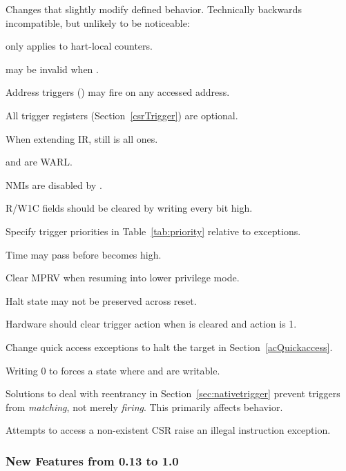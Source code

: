 \begin{steps}{Changes that slightly modify defined behavior. Technically backwards
incompatible, but unlikely to be noticeable:}
    \item \FcsrDcsrStopcount only applies to hart-local counters. 
    \item \FdmDmstatusVersion may be invalid when . 
    \item Address triggers (\RcsrMcontrol) may fire on any accessed address. 
    \item All trigger registers (Section~\ref{csrTrigger}) are optional. 
    \item When extending IR, \RdtmBypass still is all ones. 
    \item \FcsrDcsrEbreaks and \FcsrDcsrEbreaku are WARL. 
    \item NMIs are disabled by \FcsrDcsrStepie. 
    \item R/W1C fields should be cleared by writing every bit high. 
    \item Specify trigger priorities in Table~\ref{tab:priority} relative to exceptions. 
    \item Time may pass before \FdmDmcontrolDmactive becomes high. 
    \item Clear MPRV when resuming into lower privilege mode. 
    \item Halt state may not be preserved across reset. 
    \item Hardware should clear trigger action when \FcsrTdataOneDmode is
        cleared and action is 1. 
    \item Change quick access exceptions to halt the target in
    Section~\ref{acQuickaccess}. 
    \item Writing 0 to \RcsrTdataOne forces a state where \RcsrTdataTwo and
        \RcsrTdataThree are writable. 
    \item Solutions to deal with reentrancy in Section~\ref{sec:nativetrigger}
        prevent triggers from {\em matching}, not merely {\em firing}. This primarily
        affects \RcsrIcount behavior. 
    \item Attempts to access a non-existent CSR raise an illegal instruction
        exception. 
\end{steps}

\subsubsection{New Features from 0.13 to 1.0}

